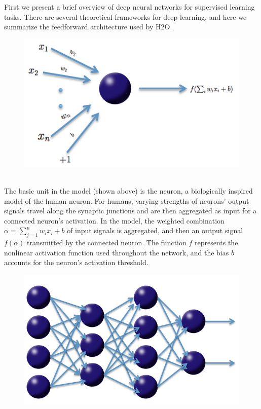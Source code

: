 \documentclass[12pt]{article}
\begin{document}
First we present a brief overview of deep neural networks for supervised learning tasks. There are several theoretical frameworks for deep learning, and here we summarize the feedforward architecture used by H2O. 
\\
\begin{figure}[h]
\centering
\includegraphics[scale=0.5]{neuron.png}
\end{figure}
\\
\noindent
The basic unit in the model (shown above) is the neuron, a biologically inspired model of the human neuron. For humans, varying strengths of neurons' output signals travel along the synaptic junctions and are then aggregated  as input for a connected neuron's activation. In the model, the weighted combination $\alpha = \sum_{j=1}^{n} w_i x_i + b$ of input signals is aggregated, and then an output signal $f(\alpha)$ transmitted by the connected neuron. The function $f$ represents the nonlinear activation function used throughout the network, and the bias $b$ accounts for the neuron's activation threshold. 
\\
\begin{figure}[h!]
\centering
\includegraphics[scale=0.3]{net.png}
\end{figure}
\end{document}
